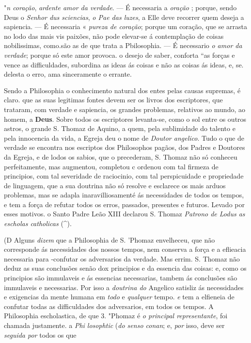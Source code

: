 "\emph{n coração}, \emph{ardente amor da verdade}. --- É necessaria a \emph{oração} ; porque, sendo Deus o \emph{Senhor dus sciencias}, \emph{o Pae das luzes}, a Elle deve recorrer quem deseja a sapiencia. --- É necessaria « \emph{pureza de coração}; porque um coração, que se arrasta no lodo das mais vis paixões, não pode elevar-se á contemplação de coisas nobilissimas, como.são as de que trata a Pbilosophia. --- É necessario \emph{o amor da verdade}; porque só este amor provoca. o desejo de saber, conforta “as forças e vence as difficuldades, subordina as ideas ás coisas e não as coisas ás ideas, e, se. delesta o erro, ama sinceramente o errante.


 
Sendo a Philosophia o conhecimento natural dos entes pelas causas supremas, é claro. que as suas legitimas fontes devem ser os livros dos escriptores, que trataram, com verdade e sapiencia, os grandes problemas, relativos ao mundo, ao homem, a \textbf{Deus}. Sobre todos os escriptores levanta-se, como o sol entre os outros astros, o grande S. Thomaz de Aquino, a quem, pela sublimidade do talento e pela innocencia da vida, a Egreja deu o nome de \emph{Doutor angelico}. Tudo o que de verdade se encontra nos escriptos dos Philosophos pagãos, dos Padres e Doutores da Egreja, e de lodos os sabios, que o precederam, S. Thomaz não só conheceu perfeitamente, mas augmentou, completou c ordenou com tal firmeza de principios, com tal severidade de raciocinio, com tal perspicuidade e propriedade de linguagem, que a sua doutrina não só resolve e esclarece os mais arduos problemas, mas se adapla inaravilliosamenté ás necessidades de todos os tempos, e tem a força de refutar todos os erros, passados, presentes e futuros. Levado por esses motivos. o Santo Padre Leão XIII declarou S. Thomaz \emph{Patrono de Lodus as escholas catholicas} (\textasciicircum{}).

(D Alguns \emph{dizem} que a Philosophia de S. 'Phomaz envelheceu, que não corresponde ás necessidades dos nossos tempos, nem conserva a força e a eflieacia necessaria para -confutar os adversarios da verdade. Mas errim. S. Thomaz não deduz as suas conclusões senão dox principios e da essencia das coisas: e, como os principios são immulaveis e ás essencias necessarias, tambem ás conclusões são immulaveis e necessarias. Por isso a \emph{doutrina do} Angelico satisliz ás necessidades e exigencias da mente humana em \emph{todo} e \emph{qualquer} tempo. \emph{e} tem a elfieneia de confutar todas as difficuldades dos adversarios, em todos os tempos. A Philosophia escholastica, de que 3. "Phomaz é \emph{o principal representante}, foi chamada justamente. a \emph{Phi losophtic} (\emph{do senso conan}; e, \emph{por} isso, deve ser \emph{seguida por} todos os que

